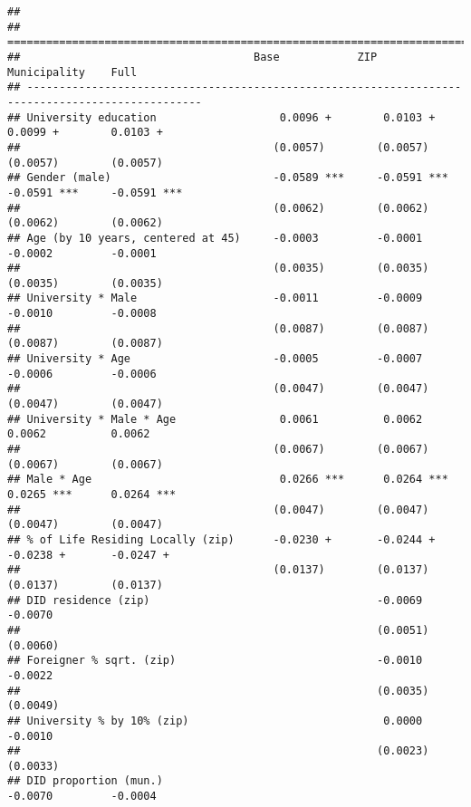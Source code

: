 \documentclass[
]{article}
\begin{document}
\begin{verbatim}
## 
## =================================================================================================
##                                    Base            ZIP             Municipality    Full          
## -------------------------------------------------------------------------------------------------
## University education                   0.0096 +        0.0103 +        0.0099 +        0.0103 +  
##                                       (0.0057)        (0.0057)        (0.0057)        (0.0057)   
## Gender (male)                         -0.0589 ***     -0.0591 ***     -0.0591 ***     -0.0591 ***
##                                       (0.0062)        (0.0062)        (0.0062)        (0.0062)   
## Age (by 10 years, centered at 45)     -0.0003         -0.0001         -0.0002         -0.0001    
##                                       (0.0035)        (0.0035)        (0.0035)        (0.0035)   
## University * Male                     -0.0011         -0.0009         -0.0010         -0.0008    
##                                       (0.0087)        (0.0087)        (0.0087)        (0.0087)   
## University * Age                      -0.0005         -0.0007         -0.0006         -0.0006    
##                                       (0.0047)        (0.0047)        (0.0047)        (0.0047)   
## University * Male * Age                0.0061          0.0062          0.0062          0.0062    
##                                       (0.0067)        (0.0067)        (0.0067)        (0.0067)   
## Male * Age                             0.0266 ***      0.0264 ***      0.0265 ***      0.0264 ***
##                                       (0.0047)        (0.0047)        (0.0047)        (0.0047)   
## % of Life Residing Locally (zip)      -0.0230 +       -0.0244 +       -0.0238 +       -0.0247 +  
##                                       (0.0137)        (0.0137)        (0.0137)        (0.0137)   
## DID residence (zip)                                   -0.0069                         -0.0070    
##                                                       (0.0051)                        (0.0060)   
## Foreigner % sqrt. (zip)                               -0.0010                         -0.0022    
##                                                       (0.0035)                        (0.0049)   
## University % by 10% (zip)                              0.0000                         -0.0010    
##                                                       (0.0023)                        (0.0033)   
## DID proportion (mun.)                                                 -0.0070         -0.0004    

\end{verbatim}
\end{document}
